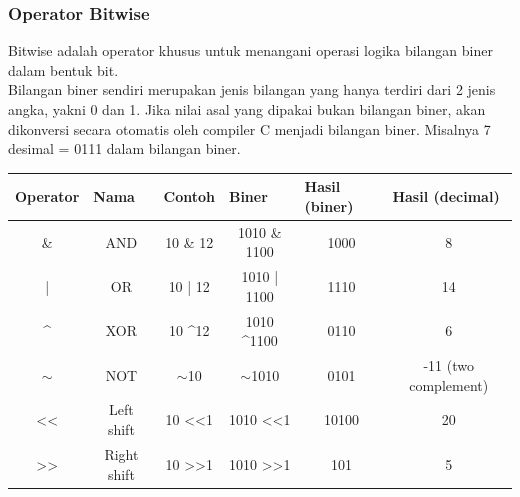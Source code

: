 \subsubsection{Operator Bitwise}
Bitwise adalah operator khusus untuk menangani operasi logika bilangan biner dalam bentuk bit. \\
Bilangan biner sendiri merupakan jenis bilangan yang hanya terdiri dari 2 jenis angka, yakni 0 dan 1.
Jika nilai asal yang dipakai bukan bilangan biner, akan dikonversi secara otomatis oleh compiler C menjadi bilangan biner. Misalnya 7 desimal = 0111 dalam bilangan biner.
\\
\begin{center}
	\begin{tabular}{|c|c|c|c|c|c|}
		\hline
		\multicolumn{1}{|l|}{Operator} & \multicolumn{1}{|l|}{Nama} & \multicolumn{1}{|l|}{Contoh}    & \multicolumn{1}{|l|}{Biner}       & \multicolumn{1}{|l|}{Hasil (biner)} & \multicolumn{1}{|l|}{Hasil (decimal)} \\ \hline
		\&                             & AND                        & 10 \& 12                        & 1010 \& 1100                      & 1000                                & 8                                     \\ \hline
		|                              & OR                         & 10 | 12                         & 1010 | 1100                       & 1110                                & 14                                    \\ \hline
		\textasciicircum{}             & XOR                        & 10 \textasciicircum 12          & 1010 \textasciicircum 1100        & 0110                                & 6                                     \\ \hline
		$\sim$                         & NOT                        & $\sim$10                        & $\sim$1010                        & 0101                                & -11 (two complement)                  \\ \hline
		\textless{}\textless{}         & Left shift                 & 10 \textless{}\textless 1       & 1010 \textless{}\textless 1       & 10100                               & 20                                    \\ \hline
		\textgreater{}\textgreater{}   & Right shift                & 10 \textgreater{}\textgreater 1 & 1010 \textgreater{}\textgreater 1 & 101                                 & 5                                     \\ \hline
	\end{tabular}
\end{center}

